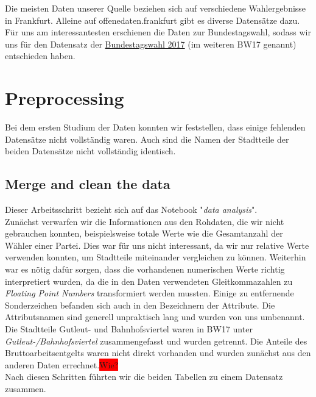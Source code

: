\documentclass[a4paper,10pt]{scrartcl}
\begin{document}
Die meisten Daten unserer Quelle beziehen sich auf verschiedene Wahlergebnisse in Frankfurt. Alleine auf offenedaten.frankfurt gibt es diverse Datensätze dazu. Für uns am interessantesten  erschienen die Daten zur Bundestagswahl, sodass wir uns für den Datensatz der \href{https://offenedaten.frankfurt.de/dataset/bundestagswahl-2017-ergebnisse-in-frankfurt-am-main}{Bundestagswahl 2017} (im weiteren BW17 genannt) entschieden haben.



\section{Preprocessing}
Bei dem ersten Studium der Daten konnten wir feststellen, dass einige fehlenden Datensätze nicht vollständig waren. Auch sind die Namen der Stadtteile der beiden Datensätze nicht vollständig identisch.

\subsection{Merge and clean the data}
Dieser Arbeitsschritt bezieht sich auf das Notebook "\textit{data analysis}".\\
Zunächst verwarfen wir die Informationen aus den Rohdaten, die wir nicht gebrauchen konnten, beispielsweise totale Werte wie die Gesamtanzahl der Wähler einer Partei. Dies war für uns nicht interessant, da wir nur relative Werte verwenden konnten, um Stadtteile miteinander vergleichen zu können. Weiterhin war es nötig dafür sorgen, dass die vorhandenen numerischen Werte richtig interpretiert wurden, da die in den Daten verwendeten Gleitkommazahlen zu \textit{Floating Point Numbers} transformiert werden mussten. Einige zu entfernende Sonderzeichen befanden sich auch in den Bezeichnern der Attribute. Die Attributsnamen sind generell unpraktisch lang und wurden von uns umbenannt. Die Stadtteile Gutleut- und Bahnhofsviertel waren in BW17 unter \emph{Gutleut-/Bahnhofsviertel} zusammengefasst und wurden getrennt. Die Anteile des Bruttoarbeitsentgelts waren nicht direkt vorhanden und wurden zunächst aus den anderen Daten errechnet.\colorbox{red}{Wie?} \\
Nach diesen Schritten führten wir die beiden Tabellen zu einem Datensatz zusammen.
\end{document}
